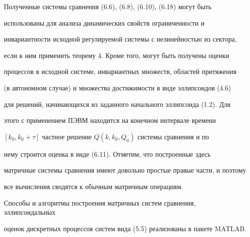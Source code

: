Полученные системы сравнения (6.6), (6.8), (6.10), (6.18) могут быть


использованы для анализа динамических свойств ограниченности и


инвариантности исходной регулируемой системы с нелинейностью из сектора,


если к ним применить теорему 4. Кроме того, могут быть получены оценки


процессов в исходной системе, инвариантных множеств, областей притяжения


(в автономном случае) и множества достижимости в виде эллипсоидов (4.6)


для решений, начинающихся из заданного начального эллипсоида (1.2). Для


этого с применением ПЭВМ находится на конечном интервале времени


$[k_0,k_0+\tau]$ частное решение $Q(k,k_0,Q_0)$ системы сравнения и по


нему строится оценка в виде (6.11). Отметим, что построенные здесь


матричные системы сравнения имеют довольно простые правые части, и поэтому


все вычисления сводятся к обычным матричным операциям.





Способы и алгоритмы построения матричных систем сравнения, эллипсоидальных


оценок дискретных процессов систем вида (5.5) реализованы в пакете MATLAB.





